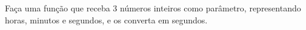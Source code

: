 
\question[10]

Faça uma função que receba 3 números inteiros como parâmetro, representando horas, minutos e segundos, e os converta em segundos.

